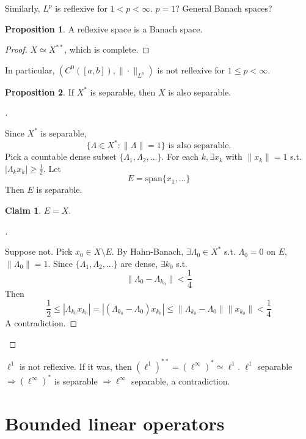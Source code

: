 \documentclass{article}
\theoremstyle{definition}
\newtheorem{prop}{Proposition}
\newtheorem*{clm}{Claim}
\newenvironment{proofs}[1][\proofname]{%
  \begin{proof}[#1]$ $\par\nobreak\ignorespaces
}{%
  \end{proof}
}
\begin{document}
Similarly, $L^p$ is reflexive for $1< p < \infty$.
$p = 1$?
General Banach spaces?

\begin{prop}
	A reflexive space is a Banach space.
\end{prop}

\begin{proof}
	$X \simeq X^{**}$, which is complete.
\end{proof}

In particular, $(C^0([a, b]), \|\cdot\|_{L^p})$ is not reflexive for $1 \leq p < \infty$.

\begin{prop}
	If $X^*$ is separable, then $X$ is also separable.
\end{prop}

\begin{proofs}
	Since $X^*$ is separable, 
	\[
		\{\Lambda \in X^*: \|\Lambda\| = 1\} \text{ is also separable.}
	\]
	Pick a countable dense subset $\{\Lambda_1, \Lambda_2, ...\}$.
	For each $k, \exists x_k$ with $\|x_k\| = 1$ s.t. $|\Lambda_k x_k| \geq \frac{1}{2}$.
	Let 
	\[
		E = \text{span} \{x_1, ...\}
	\]
	Then $E$ is separable.
	\begin{clm}
		$E = X$.
	\end{clm}

	\begin{proofs}
		Suppose not. 
		Pick $x_0 \in X \setminus E$.
		By Hahn-Banach, $\exists \Lambda_0 \in X^*$ s.t. $\Lambda_0 = 0$ on $E$, $\|\Lambda_0\| = 1$.
		Since $\{\Lambda_1, \Lambda_2, ...\}$ are dense, $\exists k_0$ s.t.
		\[
			\|\Lambda_0 - \Lambda_{k_0}\| < \frac{1}{4}
		\]
		Then 
		\[
			\frac{1}{2} \leq |\Lambda_{k_0} x_{k_0}| = | (\Lambda_{k_0} - \Lambda_0) x_{k_0}| \leq \|\Lambda_{k_0} - \Lambda_0\|\|x_{k_0}\| < \frac{1}{4}
		\]
		A contradiction.
	\end{proofs}
\end{proofs}

$\ell^1$ is not reflexive.
If it was, then $(\ell^1)^{**} = (\ell^\infty)^* \simeq \ell^1$.
$\ell^1$ separable $\Rightarrow (\ell^\infty)^*$ is separable $\Rightarrow \ell^\infty$ separable, a contradiction.

\section*{Bounded linear operators}
\end{document}
